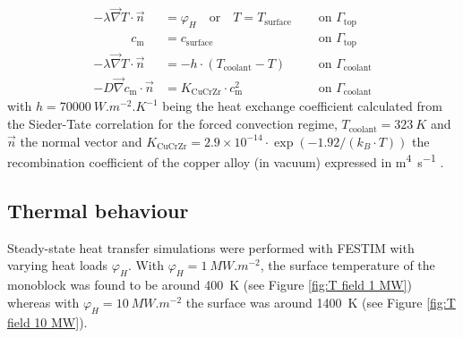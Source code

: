 \begin{eqnarray}
    -\lambda \vec{\nabla} T \cdot \vec{n} &=\varphi_{H} \quad \text{or} \quad T = T_\mathrm{surface}\quad &\text { on } \Gamma_\mathrm{top}\\
    \qquad \quad c_\mathrm{m} &=  c_\mathrm{surface}\quad &\text { on } \Gamma_\mathrm{top}\\
    -\lambda \vec{\nabla} T\cdot \vec{n} &= -h \cdot \left(T_\mathrm{coolant} - T\right)\quad &\text { on } \Gamma_\mathrm{coolant}\\
    -D \vec{\nabla} c_\mathrm{m} \cdot \vec{n} &= K_\mathrm{CuCrZr} \cdot c_\mathrm{m}^{2} \quad &\text { on } \Gamma_\mathrm{coolant}
\end{eqnarray}
with $h=\SI{70000}{W.m^{-2}.K^{-1}}$ being the heat exchange coefficient calculated from the Sieder-Tate correlation for the forced convection regime, $T_\mathrm{coolant}= \SI{323}{K}$ and $\vec{n}$ the normal vector and $K_\mathrm{CuCrZr} = 2.9 \times 10^{-14}\cdot \exp{(-1.92/(k_B\cdot T))}$ the recombination coefficient of the copper alloy (in vacuum) expressed in \si{m^4.s^{-1}} \cite{anderl_deuterium_1999}.


\subsection{Thermal behaviour}
Steady-state heat transfer simulations were performed with FESTIM with varying heat loads $\varphi_H$.
With $\varphi_H = \SI{1}{MW.m^{-2}}$, the surface temperature of the monoblock was found to be around \SI{400}{K} (see Figure \ref{fig:T field 1 MW}) whereas with $\varphi_H = \SI{10}{MW.m^{-2}}$ the surface was around \SI{1400}{K} (see Figure \ref{fig:T field 10 MW}).


